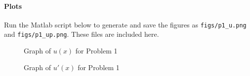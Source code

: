 \documentclass[12pt, a4paper]{article}
\begin{document}
\paragraph{Plots}
Run the Matlab script below to generate and save the figures as
\texttt{figs/p1\_u.png} and \texttt{figs/p1\_up.png}. These files are included here.

\begin{figure}[h]
  \centering
  \caption{Graph of \(u(x)\) for Problem 1}
\end{figure}

\begin{figure}[h]
  \centering
  \caption{Graph of \(u'(x)\) for Problem 1}
\end{figure}
\end{document}
